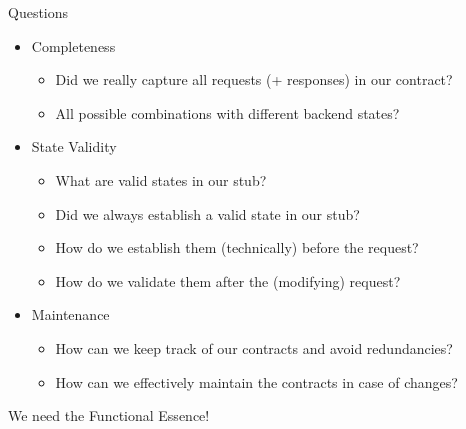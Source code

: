 \begin{frame}[fragile]{Questions}

\begin{itemize}[<+->]
\item Completeness
\begin{itemize}
\item Did we really capture all requests (+ responses) in our contract?
\item All possible combinations with different backend states?
\end{itemize}

\vspace{1em}
\item State Validity
\begin{itemize}
\item What are valid states in our stub?
\item Did we always establish a valid state in our stub?
\item How do we establish them (technically) before the request?
\item How do we validate them after the (modifying) request?
\end{itemize}

\vspace{1em}
\item Maintenance
\begin{itemize}
\item How can we keep track of our contracts and avoid redundancies?
\item How can we effectively maintain the contracts in case of changes?
\end{itemize}
\end{itemize}

\end{frame}

\begin{frame}[fragile]{}

\begin{center}
{\Huge
We need the Functional Essence!
}
\end{center}

\end{frame}

